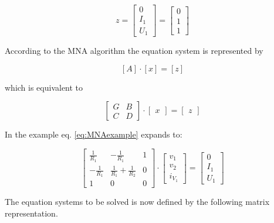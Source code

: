 \begin{equation}
z =
\begin{bmatrix}
0\\
I_{1}\\
U_{1}
\end{bmatrix}
=
\begin{bmatrix}
0\\
1\\
1
\end{bmatrix}
\end{equation}

According to the MNA algorithm the equation system is represented by

\begin{equation}
\left[A\right] \cdot \left[x\right] = \left[z\right]
\end{equation}

which is equivalent to

\begin{equation}
\begin{bmatrix}
G & B\\
C & D
\end{bmatrix}
\cdot
\begin{bmatrix}
x
\end{bmatrix}
=
\begin{bmatrix}
z
\end{bmatrix}
\label{eq:MNAexample}
\end{equation}

In the example eq. \eqref{eq:MNAexample} expands to:

\begin{equation}
\begin{bmatrix}
\frac{1}{R_{1}} & -\frac{1}{R_{1}} & 1\\
-\frac{1}{R_{1}} & \frac{1}{R_{1}} + \frac{1}{R_{2}} & 0\\
1 & 0 & 0
\end{bmatrix}
\cdot
\begin{bmatrix}
v_{1}\\
v_{2}\\
i_{V_{1}}
\end{bmatrix}
=
\begin{bmatrix}
0\\
I_{1}\\
U_{1}
\end{bmatrix}
\label{eq:MNAfull}
\end{equation}

The equation systems to be solved is now defined by the following
matrix representation.

